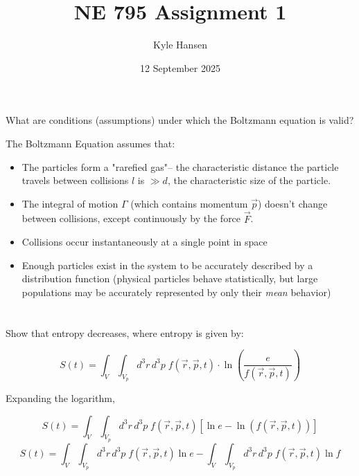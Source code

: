 \documentclass{template}
\title{NE 795 Assignment 1}
\author{Kyle Hansen}
\date{12 September 2025}
\begin{document}
\maketitle

\section{}

What are conditions (assumptions) under which the Boltzmann equation is valid?

The Boltzmann Equation assumes that:

\begin{itemize}
    \item The particles form a "rarefied gas"-- the characteristic distance the particle travels between collisions $l$ is $\gg d$, the characteristic size of the particle.
    \item The integral of motion $\Gamma$ (which contains momentum $\vec{p}$) doesn't change between collisions, except continuously by the force $\vec{F}$.
    \item Collisions occur instantaneously at a single point in space
    \item Enough particles exist in the system to be accurately described by a distribution function (physical particles behave statistically, but large populations may be accurately represented by only their \textit{mean} behavior)
\end{itemize}

\section{} Show that entropy decreases, where entropy is given by:

\begin{equation}
    S(t) = \int_{V}\int_{V_p}d^3r\,d^3p\;f(\vec{r}, \vec{p}, t) \cdot \ln\left(\frac{e}{f(\vec{r}, \vec{p}, t)}\right)
\end{equation}

Expanding the logarithm,

\begin{equation}
    S(t) = \int_{V}\int_{V_p}d^3r\,d^3p\;f(\vec{r}, \vec{p}, t) \left[ \ln e-\ln\left( f\left(\vec{r}, \vec{p}, t\right) \right) \right]
\end{equation}
\begin{equation}
     S(t) = \int_{V}\int_{V_p}d^3r\,d^3p\;f(\vec{r}, \vec{p}, t)  \ln e-\int_{V}\int_{V_p}d^3r\,d^3p\;f(\vec{r}, \vec{p}, t) \ln f
\end{equation}
\end{document}
